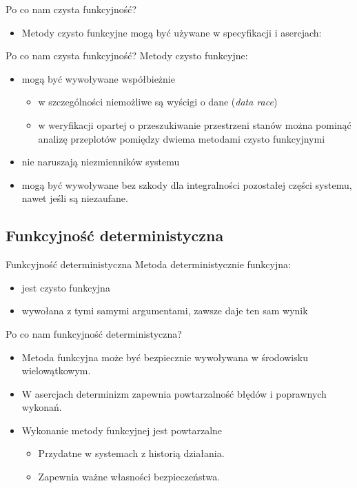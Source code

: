 \documentclass[handout]{beamer}
\begin{document}
\begin{frame}{Po co nam czysta funkcyjność?}
  \begin{itemize}
    \item Metody czysto funkcyjne mogą być używane w specyfikacji i asercjach:
  \end{itemize}
  
\end{frame}

\begin{frame}{Po co nam czysta funkcyjność?}
  Metody czysto funkcyjne:
  \begin{itemize}
  \item<1-> mogą być wywoływane współbieżnie
    \begin{itemize}
    \item w szczególności niemożliwe są wyścigi o dane (\textsl{data race})
    \item w weryfikacji opartej o przeszukiwanie przestrzeni stanów 
      można pominąć analizę przeplotów pomiędzy dwiema metodami
      czysto funkcyjnymi
    \end{itemize}
  \item<2-> nie naruszają niezmienników systemu
  \item<3-> mogą być wywoływane bez szkody dla integralności 
    pozostałej części systemu, nawet jeśli są niezaufane. 
  \end{itemize}
\end{frame}

\subsection{Funkcyjność deterministyczna}

\begin{frame}{Funkcyjność deterministyczna}
  Metoda deterministycznie funkcyjna:
  \begin{itemize}
  \item jest czysto funkcyjna
  \item wywołana z \alert<2>{tymi samymi} argumentami, zawsze daje ten sam wynik
  \end{itemize}
\end{frame}

\begin{frame}{Po co nam funkcyjność deterministyczna?}
  \begin{itemize}
  \item Metoda funkcyjna może być bezpiecznie wywoływana w środowisku
    wielowątkowym.
  \item W asercjach determinizm zapewnia powtarzalność błędów i 
    poprawnych wykonań.
  \item Wykonanie metody funkcyjnej jest powtarzalne
    \begin{itemize}
    \item Przydatne w systemach z historią działania.
    \item Zapewnia ważne własności bezpieczeństwa.
    \end{itemize}
  \end{itemize}
\end{frame}
\end{document}
